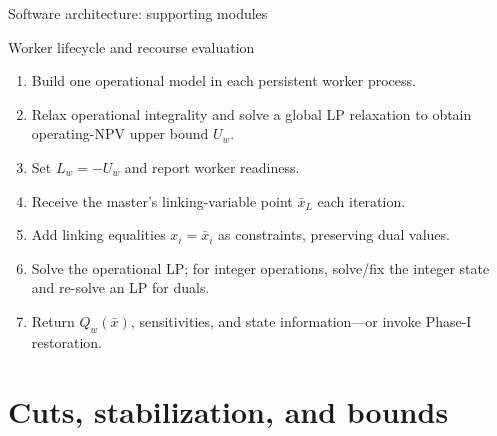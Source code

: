 \documentclass[aspectratio=169,10pt]{beamer}
\begin{document}
\begin{frame}{Software architecture: supporting modules}
\centering
{}
\end{frame}

\begin{frame}{Worker lifecycle and recourse evaluation}
\begin{enumerate}
\item Build one operational model in each persistent worker process.
\item Relax operational integrality and solve a global LP relaxation to obtain operating-NPV upper bound $U_w$.
\item Set $L_w=-U_w$ and report worker readiness.
\item Receive the master's linking-variable point $\bar{x}_L$ each iteration.
\item Add linking equalities $x_i=\bar{x}_i$ as constraints, preserving dual values.
\item Solve the operational LP; for integer operations, solve/fix the integer state and re-solve an LP for duals.
\item Return $Q_w(\bar{x})$, sensitivities, and state information—or invoke Phase-I restoration.
\end{enumerate}
\end{frame}

\section{Cuts, stabilization, and bounds}
\end{document}
